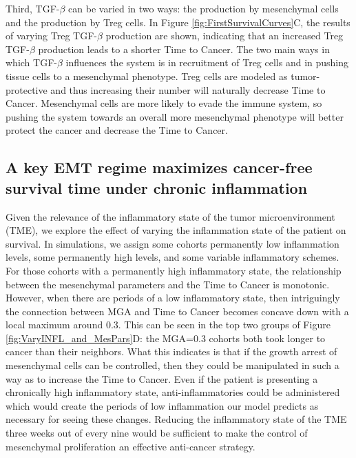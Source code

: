 \documentclass[11pt, preprint]{article}
\newcommand{\tcr} { \textcolor{red} }
\begin{document}
Third, TGF-$\beta$ can be varied in two ways: the production by mesenchymal cells and the production by Treg cells.
In Figure \ref{fig:FirstSurvivalCurves}C, the results of varying Treg TGF-$\beta$ production are shown, indicating that an increased Treg TGF-$\beta$ production leads to a shorter Time to Cancer.
The two main ways in which TGF-$\beta$ influences the system is in recruitment of Treg cells and in pushing tissue cells to a mesenchymal phenotype.
Treg cells are modeled as tumor-protective and thus increasing their number will naturally decrease Time to Cancer.
Mesenchymal cells are more likely to evade the immune system, so pushing the system towards an overall more mesenchymal phenotype will better protect the cancer and decrease the Time to Cancer.


\subsection{A key EMT regime maximizes cancer-free survival time under chronic inflammation}\label{KeyEMT}
Given the relevance of the inflammatory state of the tumor microenvironment (TME), we explore the effect of varying the inflammation state of the patient on survival.
In simulations, we assign some cohorts permanently low inflammation levels, some permanently high levels, and some variable inflammatory schemes.
For those cohorts with a permanently high inflammatory state, the relationship between the mesenchymal parameters and the Time to Cancer is monotonic.
However, when there are periods of a low inflammatory state, then intriguingly the connection between MGA and Time to Cancer becomes concave down with a local maximum around 0.3.
This can be seen in the top two groups of Figure \ref{fig:VaryINFL_and_MesPars}D: the MGA=0.3 cohorts both took longer to cancer than their neighbors.
What this indicates is that if the growth arrest of mesenchymal cells can be controlled, then they could be manipulated in such a way as to increase the Time to Cancer.
Even if the patient is presenting a chronically high inflammatory state, anti-inflammatories could be administered which would create the periods of low inflammation our model predicts as necessary for seeing these changes.
Reducing the inflammatory state of the TME three weeks out of every nine would be sufficient to make the control of mesenchymal proliferation an effective anti-cancer strategy.
\end{document}
